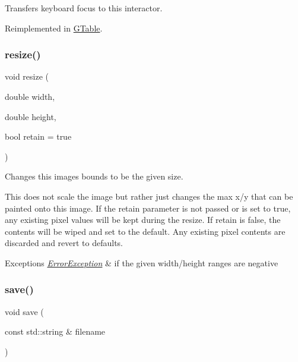 Transfers keyboard focus to this interactor. 



Reimplemented in \mbox{\hyperlink{classGTable_a49b39e0eeaf5af829e8956e9055c5cdc}{G\+Table}}.

\mbox{\label{classGCanvas_a090053938117ab698c4c9c1f1cff74a9}} 
\subsubsection{\texorpdfstring{resize()}{resize()}}
{\footnotesize\ttfamily void resize (\begin{DoxyParamCaption}\item[{double}]{width,  }\item[{double}]{height,  }\item[{bool}]{retain = {\ttfamily true} }\end{DoxyParamCaption})\hspace{0.3cm}{\ttfamily [virtual]}}



Changes this image\textquotesingle{}s bounds to be the given size. 

This does not scale the image but rather just changes the max x/y that can be painted onto this image. If the \textquotesingle{}retain\textquotesingle{} parameter is not passed or is set to true, any existing pixel values will be kept during the resize. If \textquotesingle{}retain\textquotesingle{} is false, the contents will be wiped and set to the default. Any existing pixel contents are discarded and revert to defaults. 
\begin{DoxyExceptions}{Exceptions}
{\em \mbox{\hyperlink{classErrorException}{Error\+Exception}}} & if the given width/height ranges are negative \\
\hline
\end{DoxyExceptions}
\mbox{\label{classGCanvas_a2c027edbcd25b820dc6e21a9a3ad0496}} 
\subsubsection{\texorpdfstring{save()}{save()}}
{\footnotesize\ttfamily void save (\begin{DoxyParamCaption}\item[{const std\+::string \&}]{filename }\end{DoxyParamCaption})\hspace{0.3cm}{\ttfamily [virtual]}}




